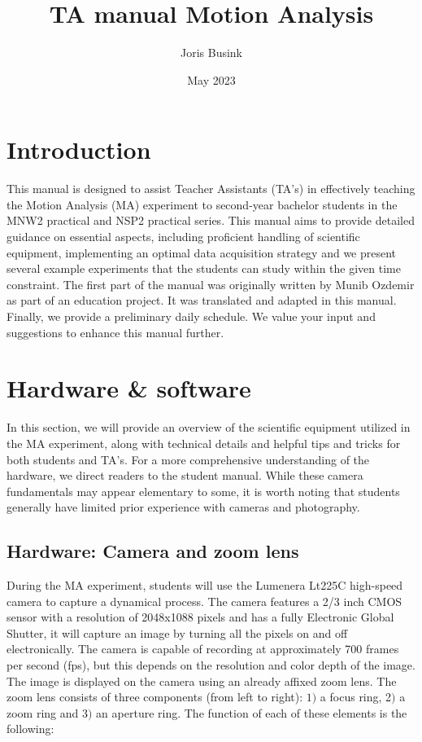 \documentclass{article}
\title{TA manual Motion Analysis}
\author{Joris Busink}
\date{May 2023}
\begin{document}
\maketitle

\tableofcontents

\newpage

\section{Introduction}
This manual is designed to assist Teacher Assistants (TA's) in effectively teaching the Motion Analysis (MA) experiment to second-year bachelor students in the MNW2 practical and NSP2 practical series. This manual aims to provide detailed guidance on essential aspects, including proficient handling of scientific equipment, implementing an optimal data acquisition strategy and we present several example experiments that the students can study within the given time constraint. The first part of the manual was originally written by Munib Ozdemir as part of an education project. It was translated and adapted in this manual. Finally, we provide a preliminary daily schedule. We value your input and suggestions to enhance this manual further.

\newpage 

\section{Hardware \& software}
In this section, we will provide an overview of the scientific equipment utilized in the MA experiment, along with technical details and helpful tips and tricks for both students and TA's. For a more comprehensive understanding of the hardware, we direct readers to the student manual. While these camera fundamentals may appear elementary to some, it is worth noting that students generally have limited prior experience with cameras and photography. 

\subsection{Hardware: Camera and zoom lens}
During the MA experiment, students will use the Lumenera Lt225C high-speed camera to capture a dynamical process. The camera features a 2/3 inch CMOS sensor with a resolution of 2048x1088 pixels and has a fully Electronic Global Shutter, it will capture an image by turning all the pixels on and off electronically. The camera is capable of recording at approximately 700 frames per second (fps), but this depends on the resolution and color depth of the image. The image is displayed on the camera using an already affixed zoom lens. The zoom lens consists of three components (from left to right): $1)$ a focus ring, 2$)$ a zoom ring and $3)$ an aperture ring. The function of each of these elements is the following:
\end{document}
